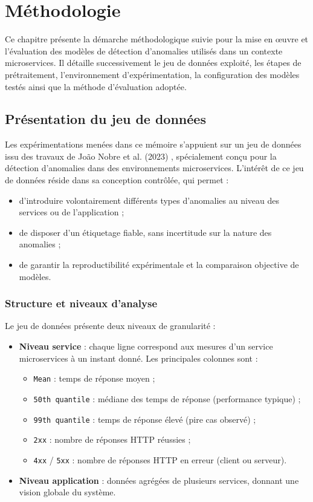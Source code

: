 \documentclass[a4paper,12pt]{report}
\begin{document}
\chapter{Méthodologie}

Ce chapitre présente la démarche méthodologique suivie pour la mise en œuvre et l’évaluation des modèles de détection d’anomalies utilisés dans un contexte microservices. Il détaille successivement le jeu de données exploité, les étapes de prétraitement, l’environnement d’expérimentation, la configuration des modèles testés ainsi que la méthode d’évaluation adoptée.

\section{Présentation du jeu de données}

Les expérimentations menées dans ce mémoire s’appuient sur un jeu de données issu des travaux de João Nobre et al. (2023) \cite{nobre2023}, spécialement conçu pour la détection d’anomalies dans des environnements microservices.  
L’intérêt de ce jeu de données réside dans sa conception contrôlée, qui permet :
\begin{itemize}
    \item d’introduire volontairement différents types d’anomalies au niveau des services ou de l’application ;
    \item de disposer d’un étiquetage fiable, sans incertitude sur la nature des anomalies ;
    \item de garantir la reproductibilité expérimentale et la comparaison objective de modèles.
\end{itemize}

\subsection*{Structure et niveaux d’analyse}

Le jeu de données présente deux niveaux de granularité :
\begin{itemize}
    \item \textbf{Niveau service} : chaque ligne correspond aux mesures d’un service microservices à un instant donné. Les principales colonnes sont :
    \begin{itemize}
        \item \texttt{Mean} : temps de réponse moyen ;
        \item \texttt{50th quantile} : médiane des temps de réponse (performance typique) ;
        \item \texttt{99th quantile} : temps de réponse élevé (pire cas observé) ;
        \item \texttt{2xx} : nombre de réponses HTTP réussies ;
        \item \texttt{4xx} / \texttt{5xx} : nombre de réponses HTTP en erreur (client ou serveur).
    \end{itemize}
    \item \textbf{Niveau application} : données agrégées de plusieurs services, donnant une vision globale du système.
\end{itemize}
\end{document}
